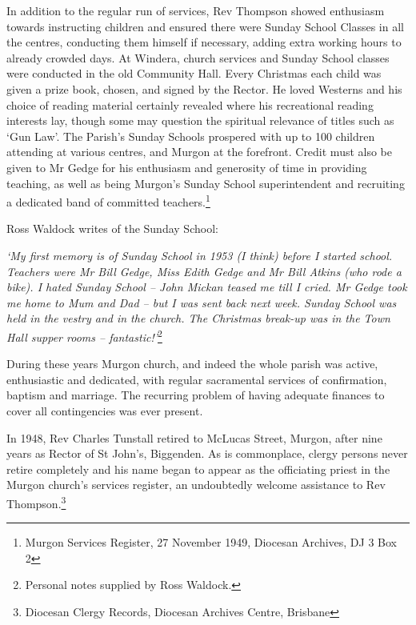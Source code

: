 In addition to the regular run of services, Rev Thompson showed enthusiasm towards instructing children and ensured there were Sunday School Classes in all the centres, conducting them himself if necessary, adding extra working hours to already crowded days. At Windera, church services and Sunday School classes were conducted in the old Community Hall. Every Christmas each child was given a prize book, chosen, and signed by the Rector. He loved Westerns and his choice of reading material certainly revealed where his recreational reading interests lay, though some may question the spiritual relevance of titles such as `Gun Law'. The Parish's Sunday Schools prospered with up to 100 children attending at various centres, and Murgon at the forefront. Credit must also be given to Mr Gedge for his enthusiasm and generosity of time in providing teaching, as well as being Murgon's Sunday School superintendent and recruiting a dedicated band of committed teachers.\footnote{Murgon Services Register, 27 November 1949, Diocesan Archives, DJ 3 Box 2}


Ross Waldock writes of the Sunday School:



\emph{`My first memory is of Sunday School in 1953 (I think) before I started school. Teachers were Mr Bill Gedge, Miss Edith Gedge and Mr Bill Atkins (who rode a bike). I hated Sunday School -- John Mickan teased me till I cried. Mr Gedge took me home to Mum and Dad -- but I was sent back next week. Sunday School was held in the vestry and in the church. The Christmas break-up was in the Town Hall supper rooms -- fantastic!'}\footnote{Personal notes supplied by Ross Waldock.}


\smallskip


During these years Murgon church, and indeed the whole parish was active, enthusiastic and dedicated, with regular sacramental services of confirmation, baptism and marriage. The recurring problem of having adequate finances to cover all contingencies was ever present.



In 1948, Rev Charles Tunstall retired to McLucas Street, Murgon, after nine years as Rector of St John's, Biggenden. As is commonplace, clergy persons never retire completely and his name began to appear as the officiating priest in the Murgon church's services register, an undoubtedly welcome assistance to Rev Thompson.\footnote{Diocesan Clergy Records, Diocesan Archives Centre, Brisbane}


